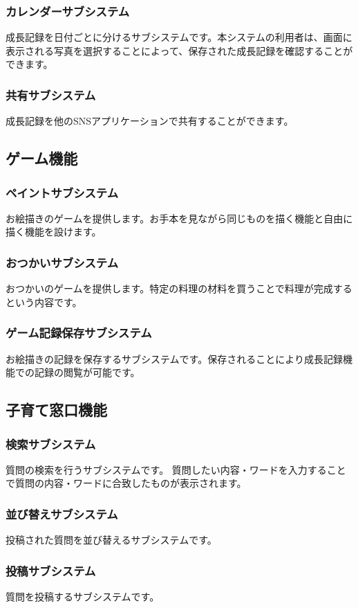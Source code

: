 \documentclass[a4j]{jarticle}
\begin{document}
\subsubsection*{カレンダーサブシステム}
成長記録を日付ごとに分けるサブシステムです。本システムの利用者は、画面に表示される写真を選択することによって、保存された成長記録を確認することができます。
\subsubsection*{共有サブシステム}
成長記録を他のSNSアプリケーションで共有することができます。

\subsection{ゲーム機能}
\subsubsection*{ペイントサブシステム}
お絵描きのゲームを提供します。お手本を見ながら同じものを描く機能と自由に描く機能を設けます。
\subsubsection*{おつかいサブシステム}
おつかいのゲームを提供します。特定の料理の材料を買うことで料理が完成するという内容です。
\subsubsection*{ゲーム記録保存サブシステム}
お絵描きの記録を保存するサブシステムです。保存されることにより成長記録機能での記録の閲覧が可能です。

\subsection{子育て窓口機能}
\subsubsection*{検索サブシステム}
質問の検索を行うサブシステムです。 質問したい内容・ワードを入力することで質問の内容・ワードに合致したものが表示されます。
\subsubsection*{並び替えサブシステム}
投稿された質問を並び替えるサブシステムです。
\subsubsection*{投稿サブシステム}
質問を投稿するサブシステムです。
\end{document}

